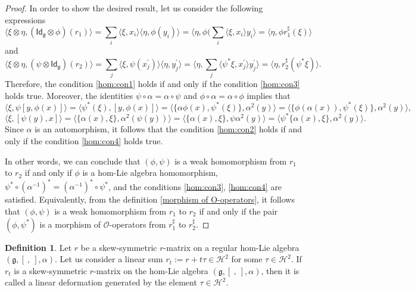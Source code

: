 \documentclass[a4paper,11pt]{amsart}
\theoremstyle{plain}
\theoremstyle{definition}
\newtheorem{definition}[theorem]{Definition}
\theoremstyle{remark}
\numberwithin{equation}{section}
\begin{document}
\begin{proof}
In order to show the desired result, let us consider the following expressions 
\begin{equation*}\label{condition-5.9}
\langle\xi\otimes\eta,(\mathsf{Id}_{\mathfrak{g}}\otimes \phi)(r_1)\rangle=\sum\limits_{i}\langle \xi,x_i\rangle \langle \eta,\phi(y_i)\rangle =\langle\eta,\phi(\sum\limits_{i}\langle\xi, x_i \rangle y_i\rangle=\langle\eta,\phi r_1^\sharp(\xi)\rangle
\end{equation*}
and
\begin{equation*}\label{condition-5.10}
\langle\xi\otimes \eta,(\psi\otimes \mathsf{Id}_\mathfrak{g})(r_2)\rangle=\sum\limits_{j}\langle\xi, \psi(x_j^\prime)\rangle \langle \eta,y_j^\prime\rangle =\langle\eta,\sum\limits_j\langle \psi^*\xi,x_j^\prime \rangle y_j^\prime\rangle=\langle\eta,r_2^\sharp(\psi^*\xi)\rangle.
\end{equation*}
Therefore, the condition \eqref{hom:con1} holds if and only if the condition \eqref{hom:con3} holds true. Moreover, the identities $\psi\circ \alpha=\alpha\circ \psi$ and $\phi\circ\alpha=\alpha\circ \phi$ implies that  
\begin{equation*}\label{condition-5.7}
\langle\xi,\psi[y,\phi(x)]\rangle=\Big\langle\psi^*(\xi),[y,\phi(x)]\Big\rangle=\langle\{\alpha\phi(x),\psi^*(\xi)\},\alpha^2(y)\rangle=\langle\{\phi(\alpha (x)),\psi^*(\xi)\},\alpha^2(y)\rangle,
\end{equation*}
\begin{equation*}\label{condition-5.8}
\langle \xi,[\psi(y),x]\rangle=\langle\{\alpha(x),\xi\},\alpha^2(\psi(y))\rangle=\langle\{\alpha(x),\xi\},\psi\alpha^2(y)\rangle=\langle\psi^*\{\alpha(x),\xi\},\alpha^2(y)\rangle.
\end{equation*}
Since $\alpha$ is an automorphism, it follows that the condition \eqref{hom:con2} holds if and only if the condition \eqref{hom:con4} holds true. 


In other words, we can conclude that $(\phi,\psi)$ is a weak homomorphism from $r_1$ to $r_2$ if and only if $\phi$ is a hom-Lie algebra homomorphism, $\psi^*\circ(\alpha^{-1})^*=(\alpha^{-1})^*\circ \psi^*$, and the conditions \eqref{hom:con3}, \eqref{hom:con4} are satisfied. Equivalently, from the definition \ref{morphism of O-operators}, it follows that $(\phi,\psi)$ is a weak homomorphism from $r_1$ to $r_2$ if and only if the pair $(\phi,\psi^*)$ is a morphism of $\mathcal{O}$-operators from $r_1^\sharp$ to $r_2^\sharp$.
\end{proof}

\begin{definition}
Let $r$ be a skew-symmetric $r$-matrix on a regular hom-Lie algebra $(\mathfrak{g},[~,~],\alpha)$. Let us consider a linear sum $r_t:=r+t\tau\in \mathcal{H}^2$ for some $\tau\in \mathcal{H}^2$. If $r_t$ is a skew-symmetric $r$-matrix on the hom-Lie algebra $(\mathfrak{g},[~,~],\alpha)$, then it is called a linear deformation generated by the element $\tau\in \mathcal{H}^2$.  
\end{definition}
\end{document}
